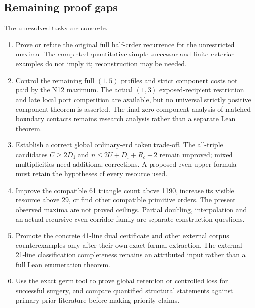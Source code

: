 \subsection{Remaining proof gaps}
\label{discussion:remaining-gaps}

The unresolved tasks are concrete:
\begin{enumerate}
\item Prove or refute the original full half-order recurrence for the
unrestricted maxima. The completed quantitative simple successor and
finite exterior examples do not imply it; reconstruction may be needed.
\item Control the remaining full $(1,5)$ profiles and strict component
costs not paid by the N12 maximum. The actual $(1,3)$ exposed-recipient
restriction and late local port competition are available, but no
universal strictly positive component theorem is asserted. The final
zero-component analysis of matched boundary contacts remains research
analysis rather than a separate Lean theorem.
\item Establish a correct global ordinary-end token trade-off. The
all-triple candidates $C\ge2D_1$ and
$n\le2U+D_1+R_c+2$ remain unproved; mixed multiplicities need additional
corrections. A proposed even upper formula must retain the hypotheses
of every resource used.
\item Improve the compatible 61 triangle count above 1190, increase its
visible resource above 29, or find other compatible primitive orders.
The present observed maxima are not proved ceilings. Partial doubling,
interpolation and an actual recursive even corridor family are separate
construction questions.
\item Promote the concrete 41-line dual certificate and other external
corpus counterexamples only after their own exact formal extraction.
The external 21-line classification completeness remains an attributed
input rather than a full Lean enumeration theorem.
\item Use the exact germ tool to prove global retention or controlled
loss for successful surgery, and compare quantified structural statements
against primary prior literature before making priority claims.
\end{enumerate}
